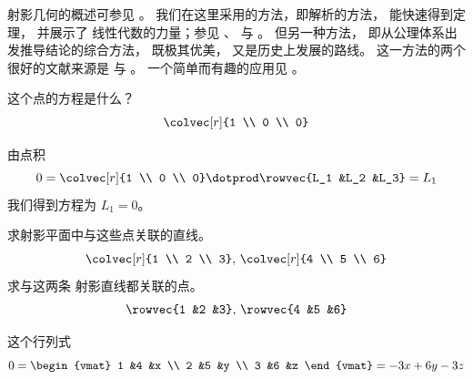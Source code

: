 射影几何的概述可参见 \cite{CourantRobbins}。
我们在这里采用的方法，即解析的方法，
能快速得到定理，%
并展示了
线性代数的力量；参见 \cite{Hanes}、\cite{Ryan} 与
\cite{Eggar}。
但另一种方法，
即从公理体系出发推导结论的综合方法，
既极其优美，
又是历史上发展的路线。
这一方法的两个很好的文献来源是 \cite{Coxeter} 与 \cite{Seidenberg}。
一个简单而有趣的应用见 \cite{Davies}。

\begin{exercises}
  \item 
    这个点的方程是什么？
    \begin{equation*}
       \colvec[r]{1 \\ 0 \\ 0}
    \end{equation*}
    \begin{answer}
      由点积
      \begin{equation*}
        0=\colvec[r]{1 \\ 0 \\ 0}\dotprod\rowvec{L_1 &L_2 &L_3}
         =L_1
      \end{equation*}
      我们得到方程为 $L_1=0$。
    \end{answer}
  \item 
    \begin{exparts}
      \partsitem 求射影平面中与这些点关联的直线。
          \begin{equation*}
            \colvec[r]{1 \\ 2 \\ 3},\,\colvec[r]{4 \\ 5 \\ 6}
          \end{equation*}
      \partsitem 求与这两条
          射影直线都关联的点。
          \begin{equation*}
            \rowvec{1 &2 &3},\,\rowvec{4 &5 &6}
          \end{equation*} 
    \end{exparts}
    \begin{answer}
      \begin{exparts}
        \partsitem 这个行列式
          \begin{equation*}
            0=\begin{vmat}
              1  &4  &x \\
              2  &5  &y \\
              3  &6  &z
            \end{vmat}
            =-3x+6y-3z

\end{equation*}
\end{exparts}
\end{answer}
\end{exercises}
